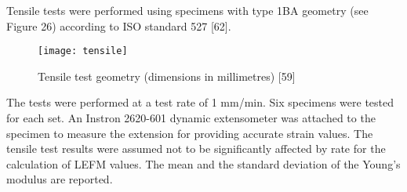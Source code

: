 \documentclass[numbers=noendperiod,chapterprefix=on]{icldt} %
\begin{document}
Tensile tests were performed using specimens with type 1BA geometry (see Figure 26) according to ISO standard 527 [62]. 

\begin{figure}[!htpb]
\centering
\texttt{[image: tensile]}
\caption{Tensile test geometry (dimensions in millimetres) [59]} %
\end{figure}

The tests were performed at a test rate of 1 mm/min. Six specimens were tested for each set. An Instron 2620-601 dynamic extensometer was attached to the specimen to measure the extension for providing accurate strain values. The tensile test results were assumed not to be significantly affected by rate for the calculation of LEFM values. The mean and the standard deviation of the Young’s modulus are reported.
\end{document}
